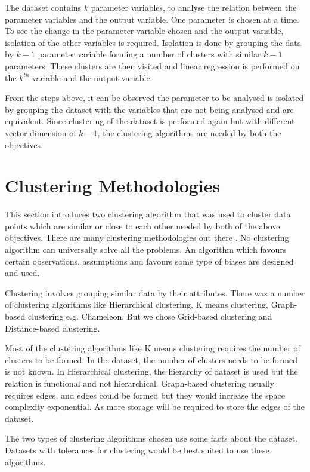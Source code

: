 The dataset contains \(k\) parameter variables, to analyse the relation between the parameter variables and the output variable. One parameter is chosen at a time. To see the change in the parameter variable chosen and the output variable, isolation of the other variables is required. Isolation is done by grouping the data by \(k-1\) parameter variable forming a number of clusters with similar \(k-1\) parameters. These clusters are then visited and linear regression is performed on the \(k^{th}\) variable and the output variable. 

From the steps above, it can be observed the parameter to be analysed is isolated by grouping the dataset with the variables that are not being analysed and are equivalent. Since clustering of the dataset is performed again but with different vector dimension of \(k-1\), the clustering algorithms are needed by both the objectives.

\section{Clustering Methodologies}

This section introduces two clustering algorithm that was used to cluster data points which are similar or close to each other needed by both of the above objectives. There are many clustering methodologies out there \cite{xu2005survey}. No clustering algorithm can universally solve all the problems. An algorithm which favours certain observations, assumptions and favours some type of biases are designed and used. 

Clustering involves grouping similar data by their attributes. There was a number of clustering algorithms like Hierarchical clustering, K means clustering, Graph-based clustering e.g. Chameleon. But we chose Grid-based clustering and Distance-based clustering.

Most of the clustering algorithms like K means clustering requires the number of clusters to be formed. In the dataset, the number of clusters needs to be formed is not known. In Hierarchical clustering, the hierarchy of dataset is used but the relation is functional and not hierarchical. Graph-based clustering usually requires edges, and edges could be formed but they would increase the space complexity exponential. As more storage will be required to store the edges of the dataset.

The two types of clustering algorithms chosen use some facts about the dataset. Datasets with tolerances for clustering would be best suited to use these algorithms.

